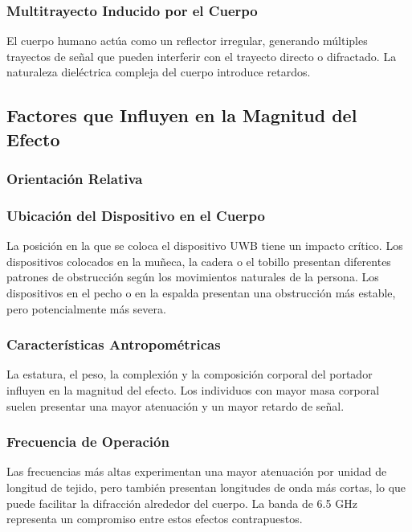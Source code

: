 \subsubsection{Multitrayecto Inducido por el Cuerpo}

El cuerpo humano actúa como un reflector irregular, generando múltiples trayectos de señal que pueden interferir con el trayecto directo o difractado. La naturaleza dieléctrica compleja del cuerpo introduce retardos.

\subsection{Factores que Influyen en la Magnitud del Efecto}

\subsubsection{Orientación Relativa}

\subsubsection{Ubicación del Dispositivo en el Cuerpo}

La posición en la que se coloca el dispositivo UWB tiene un impacto crítico. Los dispositivos colocados en la muñeca, la cadera o el tobillo presentan diferentes patrones de obstrucción según los movimientos naturales de la persona. Los dispositivos en el pecho o en la espalda presentan una obstrucción más estable, pero potencialmente más severa.

\subsubsection{Características Antropométricas}

La estatura, el peso, la complexión y la composición corporal del portador influyen en la magnitud del efecto. Los individuos con mayor masa corporal suelen presentar una mayor atenuación y un mayor retardo de señal.

\subsubsection{Frecuencia de Operación}

Las frecuencias más altas experimentan una mayor atenuación por unidad de longitud de tejido, pero también presentan longitudes de onda más cortas, lo que puede facilitar la difracción alrededor del cuerpo. La banda de 6.5 GHz representa un compromiso entre estos efectos contrapuestos.

